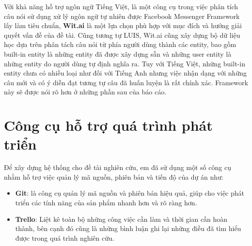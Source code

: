 \documentclass[12pt]{report}
\begin{document}
Với khả năng hỗ trợ ngôn ngữ Tiếng Việt, là một công cụ trong việc phân tích câu nói sử dụng xử lý ngôn ngữ tự nhiên được Facebook Messenger Framework lấy làm tiêu chuẩn, \textbf{Wit.ai} là một lựa chọn phù hợp với mục đích và hướng giải quyết vấn đề của đề tài. Cũng tương tự LUIS, Wit.ai cũng xây dựng bộ dữ liệu học dựa trên phân tách câu nói từ phía người dùng thành các entity, bao gồm built-in entity là những entity đã được xây dựng sẵn và những user entity là những entity do người dùng tự định nghĩa ra. Tuy với Tiếng Việt, những built-in entity chưa có nhiều loại như đối với Tiếng Anh nhưng việc nhận dạng với những câu mới và có ý diễn đạt tương tự câu đã huấn luyện là rất chính xác. Framework này sẽ được nói rõ hơn ở những phần sau của báo cáo.


\section{Công cụ hỗ trợ quá trình phát triển}
Để xây dựng hệ thống cho đề tài nghiên cứu, em đã sử dụng một số công cụ nhằm hỗ trợ việc quản lý mã nguồn, phiên bản và tiến độ của dự án như:
\begin{itemize}
	\item \textbf{Git}: là công cụ quản lý mã nguồn và phiên bản hiệu quả, giúp cho việc phát triển các tính năng của sản phẩm nhanh hơn và rõ ràng hơn.
	\item \textbf{Trello}: Liệt kê toàn bộ những công việc cần làm và thời gian cần hoàn thành, bên cạnh đó cũng là những bình luận ghi lại những điều đã tìm hiểu được trong quá trình nghiên cứu.
\end{itemize}
\end{document}
